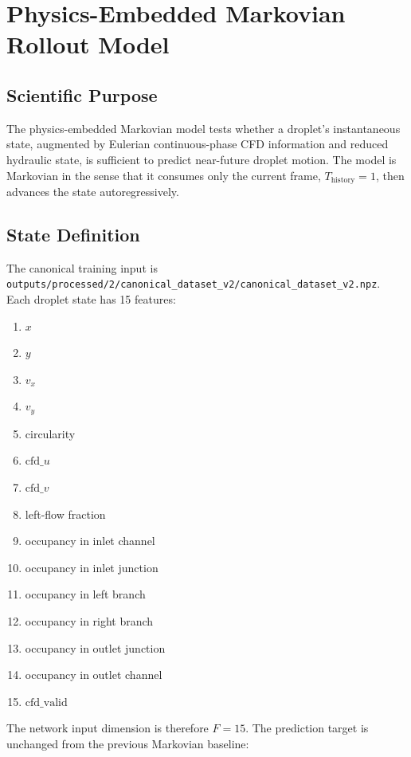 \section{Physics-Embedded Markovian Rollout Model}

\subsection{Scientific Purpose}

The physics-embedded Markovian model tests whether a droplet's instantaneous
state, augmented by Eulerian continuous-phase CFD information and reduced
hydraulic state, is sufficient to predict near-future droplet motion.  The model
is Markovian in the sense that it consumes only the current frame,
\(T_{\mathrm{history}}=1\), then advances the state autoregressively.

\subsection{State Definition}

The canonical training input is
\texttt{outputs/processed/2/canonical\_dataset\_v2/canonical\_dataset\_v2.npz}.
Each droplet state has 15 features:

\begin{enumerate}[label=\arabic*.]
  \item \(x\)
  \item \(y\)
  \item \(v_x\)
  \item \(v_y\)
  \item circularity
  \item \(\mathrm{cfd}\_u\)
  \item \(\mathrm{cfd}\_v\)
  \item left-flow fraction
  \item occupancy in inlet channel
  \item occupancy in inlet junction
  \item occupancy in left branch
  \item occupancy in right branch
  \item occupancy in outlet junction
  \item occupancy in outlet channel
  \item \(\mathrm{cfd}\_\mathrm{valid}\)
\end{enumerate}

The network input dimension is therefore \(F=15\).  The prediction target is
unchanged from the previous Markovian baseline:

